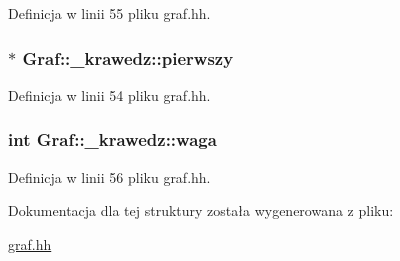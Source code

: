 \-Definicja w linii 55 pliku graf.\-hh.

\hypertarget{struct_graf_1_1__krawedz_adba487ff1b27ab413c139dff7ef02313}{
\subsubsection[{pierwszy}]{$\ast$ {\bf \-Graf\-::\-\_\-krawedz\-::pierwszy}}}\label{struct_graf_1_1__krawedz_adba487ff1b27ab413c139dff7ef02313}


\-Definicja w linii 54 pliku graf.\-hh.

\hypertarget{struct_graf_1_1__krawedz_a32556165c01ba902034186551780c7f4}{
\subsubsection[{waga}]{\setlength{\rightskip}{0pt plus 5cm}int {\bf \-Graf\-::\-\_\-krawedz\-::waga}}}\label{struct_graf_1_1__krawedz_a32556165c01ba902034186551780c7f4}


\-Definicja w linii 56 pliku graf.\-hh.



\-Dokumentacja dla tej struktury została wygenerowana z pliku\-:\begin{DoxyCompactItemize}
\item 
\hyperlink{graf_8hh}{graf.\-hh}\end{DoxyCompactItemize}
